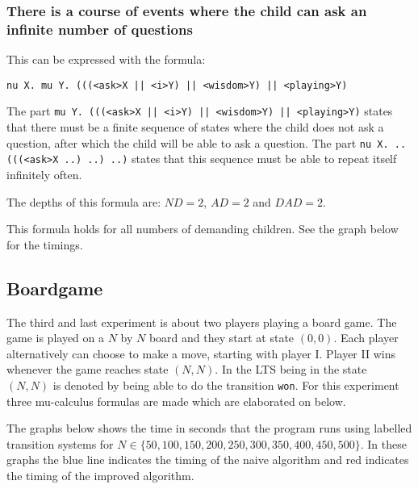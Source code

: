 \documentclass[10pt,a4paper]{article}
\begin{document}
\subsubsection{There is a course of events where the child can ask an infinite number of questions}
This can be expressed with the formula:

\begin{center}
	{\tt nu X. mu Y. (((<ask>X || <i>Y) || <wisdom>Y) || <playing>Y)}
\end{center}	
	
The part {\tt mu Y. (((<ask>X || <i>Y) || <wisdom>Y) || <playing>Y)} states that there must be a finite sequence of states where the child does not ask a question, after which the child will be able to ask a question. The part {\tt nu X. .. (((<ask>X ..) ..) ..)} states that this sequence must be able to repeat itself infinitely often.

The depths of this formula are: $ND = 2$, $AD = 2$ and $DAD = 2$.

This formula holds for all numbers of demanding children. See the graph below for the timings.



\subsection{Boardgame}
The third and last experiment is about two players playing a board game. The game is played on a $N$ by $N$ board and they start at state $(0, 0)$. Each player alternatively can choose to make a move, starting with player I. Player II wins whenever the game reaches state $(N, N)$. In the LTS being in the state $(N, N)$ is denoted by being able to do the transition {\tt won}. For this experiment three mu-calculus formulas are made which are elaborated on below.

The graphs below shows the time in seconds that the program runs using labelled transition systems for $N \in \{50, 100, 150, 200, 250, 300, 350, 400, 450, 500\}$. In these graphs the blue line indicates the timing of the naive algorithm and red indicates the timing of the improved algorithm.
\end{document}
